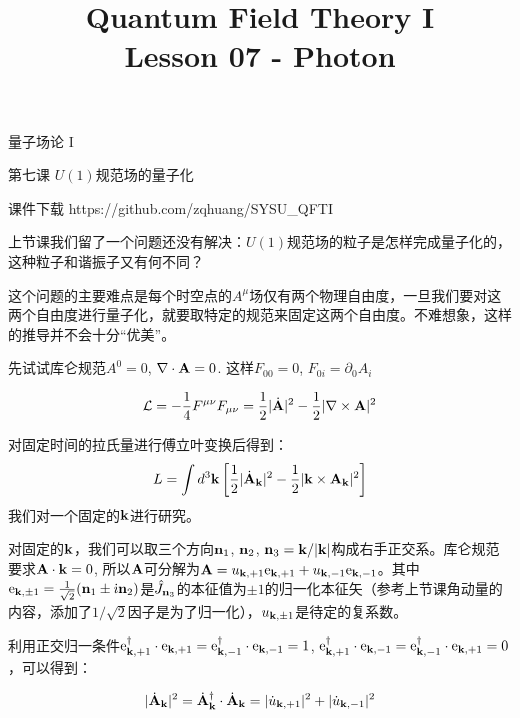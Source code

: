 \documentclass[CJK]{beamer}
\title{Quantum Field Theory I \\ Lesson 07 - Photon}
\author{}
\date{}
\begin{document}
\begin{frame}
 
\begin{center}
\begin{Large}
\bch
量子场论 I 

{\vskip 0.3in}

第七课 $U(1)$规范场的量子化

\ech
\end{Large}
\end{center}

\vskip 0.2in

\bch
课件下载
\ech
https://github.com/zqhuang/SYSU\_QFTI

\end{frame}



\begin{frame}
\bch
上节课我们留了一个问题还没有解决：$U(1)$规范场的粒子是怎样完成量子化的，这种粒子和谐振子又有何不同？

\skipline
这个问题的主要难点是每个时空点的$A^\mu$场仅有两个物理自由度，一旦我们要对这两个自由度进行量子化，就要取特定的规范来固定这两个自由度。不难想象，这样的推导并不会十分“优美”。

\ech
\end{frame}

\begin{frame}
\bch
先试试库仑规范$A^0 = 0$, $\nabla \cdot {\mathbf{A}} = 0$.
这样$F_{00} = 0$, $F_{0i} = \partial_0 A_i$

$$ {\mathcal{L}} = -\frac{1}{4} {F^{\mu\nu}}{F_{\mu\nu}} = \frac{1}{2} |\dot{{\mathbf{A}}}|^2  - \frac{1}{2}|\nabla \times {\mathbf{A}}|^2$$

对固定时间的拉氏量进行傅立叶变换后得到：
$$L = \int d^3{\mathbf{k}} \left[\frac{1}{2} |\dot{{\mathbf{A}}}_{\mathbf{k}}|^2  - \frac{1}{2}|{\mathbf{k}} \times {\mathbf{A}}_{\mathbf{k}}|^2\right]$$
我们对一个固定的${\mathbf{k}}$进行研究。

\ech
\end{frame}

\begin{frame}
\bch
对固定的${\mathbf{k}}$，我们可以取三个方向${\mathbf{n}}_1$, ${\mathbf{n}}_2$, ${\mathbf{n}}_3 = {\mathbf{k}} / |{\mathbf{k}}|$构成右手正交系。库仑规范要求${\mathbf{A}}\cdot{\mathbf{k}} = 0$, 所以${\mathbf{A}}$可分解为${\mathbf{A}} = u_{{\mathbf{k}},+1} \mathrm{e}_{{\mathbf{k}},+1} + u_{{\mathbf{k}},-1} \mathrm{e}_{{\mathbf{k}},-1}$。其中$\mathrm{e}_{{\mathbf{k}},\pm 1} = \frac{1}{\sqrt{2}}({\mathbf{n}}_1\pm {\dot{\imath}} {\mathbf{n}}_2)$是$\hat{J}_{{\mathbf{n}}_3}$的本征值为$\pm 1$的归一化本征矢（参考上节课角动量的内容，添加了$1/\sqrt{2}$因子是为了归一化），$u_{{\mathbf{k}},\pm 1}$是待定的复系数。

利用正交归一条件$\mathrm{e}_{{\mathbf{k}},+1}^\dagger \cdot \mathrm{e}_{{\mathbf{k}},+1} = \mathrm{e}_{{\mathbf{k}},-1}^\dagger \cdot \mathrm{e}_{{\mathbf{k}},-1} = 1$, $\mathrm{e}_{{\mathbf{k}},+1}^\dagger \cdot \mathrm{e}_{{\mathbf{k}},-1} = \mathrm{e}_{{\mathbf{k}},-1}^\dagger \cdot \mathrm{e}_{{\mathbf{k}},+1} = 0$，可以得到：

$$|\dot{{\mathbf{A}}}_{\mathbf{k}}|^2 = \dot{{\mathbf{A}}}_{\mathbf{k}}^\dagger \cdot \dot{{\mathbf{A}}}_{\mathbf{k}} = |\dot u_{{\mathbf{k}},+1}|^2 + |\dot u_{{\mathbf{k}},-1}|^2$$

\ech
\end{frame}
\end{document}
